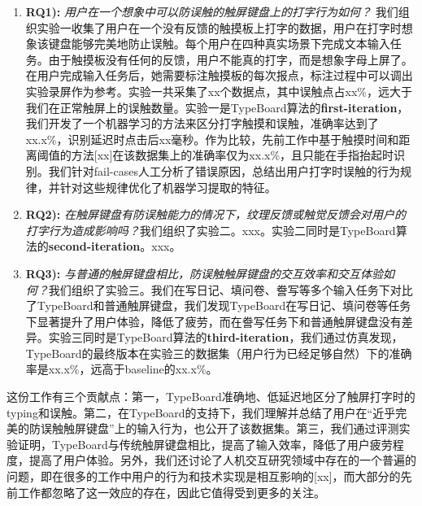 \begin{enumerate}
	\item{\textbf{RQ1):} \emph{用户在一个想象中可以防误触的触屏键盘上的打字行为如何？} 我们组织实验一收集了用户在一个没有反馈的触摸板上打字的数据，用户在打字时想象该键盘能够完美地防止误触。每个用户在四种真实场景下完成文本输入任务。由于触摸板没有任何的反馈，用户不能真的打字，而是想象字母上屏了。在用户完成输入任务后，她需要标注触摸板的每次报点，标注过程中可以调出实验录屏作为参考。实验一共采集了xx个数据点，其中误触点占xx\%，远大于我们在正常触屏上的误触数量。实验一是TypeBoard算法的\textbf{first-iteration}，我们开发了一个机器学习的方法来区分打字触摸和误触，准确率达到了xx.x\%，识别延迟时点击后xx毫秒。作为比较，先前工作中基于触摸时间和距离阈值的方法[xx]在该数据集上的准确率仅为xx.x\%，且只能在手指抬起时识别。我们针对fail-cases人工分析了错误原因，总结出用户打字时误触的行为规律，并针对这些规律优化了机器学习提取的特征。}
	\item{\textbf{RQ2):} \emph{在触屏键盘有防误触能力的情况下，纹理反馈或触觉反馈会对用户的打字行为造成影响吗？}我们组织了实验二。xxx。实验二同时是TypeBoard算法的\textbf{second-iteration}。xxx。}
	\item{\textbf{RQ3):} \emph{与普通的触屏键盘相比，防误触触屏键盘的交互效率和交互体验如何？}我们组织了实验三。我们在写日记、填问卷、誊写等多个输入任务下对比了TypeBoard和普通触屏键盘，我们发现TypeBoard在写日记、填问卷等任务下显著提升了用户体验，降低了疲劳，而在誊写任务下和普通触屏键盘没有差异。实验三同时是TypeBoard算法的\textbf{third-iteration}，我们通过仿真发现，TypeBoard的最终版本在实验三的数据集（用户行为已经足够自然）下的准确率是xx.x\%，远高于baseline的xx.x\%。}
\end{enumerate}

这份工作有三个贡献点：第一，TypeBoard准确地、低延迟地区分了触屏打字时的typing和误触。第二，在TypeBoard的支持下，我们理解并总结了用户在“近乎完美的防误触触屏键盘”上的输入行为，也公开了该数据集。第三，我们通过评测实验证明，TypeBoard与传统触屏键盘相比，提高了输入效率，降低了用户疲劳程度，提高了用户体验。另外，我们还讨论了人机交互研究领域中存在的一个普遍的问题，即在很多的工作中用户的行为和技术实现是相互影响的[xx]，而大部分的先前工作都忽略了这一效应的存在，因此它值得受到更多的关注。
